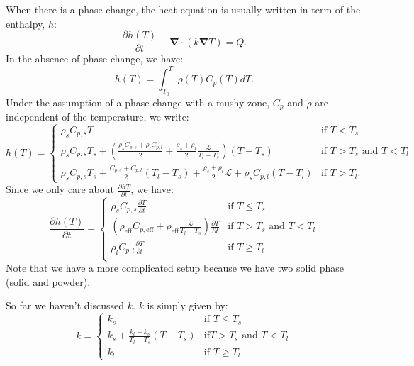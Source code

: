 \documentclass[letterpaper]{article}
\newcommand\bn{\boldsymbol{\nabla}}
\renewcommand{\(}{\left(}
\renewcommand{\)}{\right)}
\renewcommand{\[}{\left[}
\renewcommand{\]}{\right]}
\begin{document}
When there is a phase change, the heat equation is usually written in term of
the enthalpy, $h$:
\begin{equation}
  \frac{\partial h(T)}{\partial t} -  \bn \cdot \(k\bn T\) = Q.
  \label{enthalpy}
\end{equation}
In the absence of phase change, we have:
\begin{equation}
  h(T) = \int_{T_0}^T \rho(T) C_p(T) dT.
\end{equation}
Under the assumption of a phase change with a mushy zone, $C_p$ and $\rho$ are independent
of the temperature, we write:
\begin{equation}
  h(T) =      
  \begin{cases}
   \rho_s C_{p,s} T & \text{if } T<T_{s}\\
   \rho_s C_{p,s} T_s + \(\frac{\rho_s C_{p,s}+\rho_l C_{p,l}}{2} +
    \frac{\rho_s+\rho_l}{2}  \frac{\mathcal{L}}{T_l-T_s}\) (T-T_s) & \text{if } T>T_{s} \text{ and } T<T_l \\
    \rho_s C_{p,s} T_s + \frac{C_{p,s}+C_{p,l}}{2} (T_l - T_s) +
    \frac{\rho_s+\rho_l}{2} \mathcal{L} + \rho_s C_{p,l}
    (T-T_l) & \text{if } T>T_l.
  \end{cases}
\end{equation}
Since we only care about $\frac{\partial h{T}}{\partial t}$, we have:
\begin{equation}
  \frac{\partial h(T)}{\partial t} = 
  \begin{cases}
    \rho_s C_{p,s} \frac{\partial T}{\partial t} &  \text{if } T \leq T_{s}\\
     \(\rho_{\text{eff}} C_{p,\text{eff}} + \rho_{\text{eff}} \frac{\mathcal{L}}{T_l-T_s}\)
     \frac{\partial T}{\partial t}  & \text{if } T>T_{s} \text{ and } T<T_l \\
    \rho_l C_{p,l} \frac{\partial T}{\partial t} &  \text{if } T \geq T_{l}\\
  \end{cases}
\end{equation}
Note that we have a more complicated setup because we have two solid phase
(solid and powder). 

So far we haven't discussed $k$. $k$ is simply given by:
\begin{equation}
  k = 
  \begin{cases}
    k_s & \text{if } T \leq T_s \\
    k_s + \frac{k_l - k_s}{T_l - T_s} (T- T_s) & \text{if} T>T_s \text{ and }
    T<T_l \\
    k_l & \text{if } T \geq T_l
  \end{cases}
\end{equation}
\end{document}
